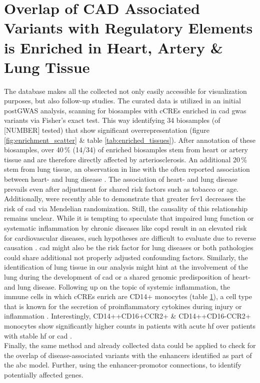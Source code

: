 \section{Overlap of CAD Associated Variants with Regulatory Elements is Enriched in Heart, Artery \& Lung Tissue}
The database makes all the collected not only easily accessible for visualization purposes, but also follow-up studies. The curated data is utilized in an initial postGWAS analysis, scanning for biosamples with \acp{cCRE} enriched in \ac{cad} \ac{gwas} variants via Fisher's exact test. This way identifying 34 biosamples (of [NUMBER] tested) that show significant overrepresentation (figure \ref{fig:enrichment_scatter} \& table \ref{tab:enriched_tissues}). After annotation of these biosamples, over 40\,\% (14/34) of enriched biosamples stem from heart or artery tissue and are therefore directly affected by arteriosclerosis. An additional 20\,\% stem from lung tissue, an observation in line with the often reported association between heart- and lung disease \cite{carterAssociationCardiovascularDisease2019, hanPulmonaryDiseasesHeart2007}. The association of heart- and lung disease prevails even after adjustment for shared risk factors such as tobacco or age. Additionally, \textcite{auyeungAssociationGeneticInstrumental2018} were recently able to demonstrate that greater \ac{fev1} decreases the risk of \ac{cad} via Mendelian randomization. Still, the causality of this relationship remains unclear. While it is tempting to speculate that impaired lung function or systematic inflammation by chronic diseases like \ac{copd} result in an elevated risk for cardiovascular diseases, such hypotheses are difficult to evaluate due to reverse causation \cite{nowakLungFunctionCoronary2018}. \ac{cad} might also be the risk factor for lung diseases or both pathologies could share additional not properly adjusted confounding factors. Similarly, the identification of lung tissue in our analysis might hint at the involvement of the lung during the development of \ac{cad} or a shared genomic predisposition of heart- and lung disease. Following up on the topic of systemic inflammation, the immune cells in which \acp{cCRE} enrich are CD14+ monocytes (table \ref{}), a cell type that is known for the secretion of proinflammatory cytokines during injury or inflammation \cite{kapellosHumanMonocyteSubsets2019}. Interestingly, CD14++CD16+CCR2+ \& CD14++CD16-CCR2+ monocytes show significantly higher counts in patients with acute \ac{hf} over patients with stable \ac{hf} or \ac{cad} \cite{wrigleyCD14CD16Monocytes2013}.\\
Finally, the same method and already collected data could be applied to check for the overlap of disease-associated variants with the enhancers identified as part of the \ac{abc} model. Further, using the enhancer-promotor connections, to identify potentially affected genes.

